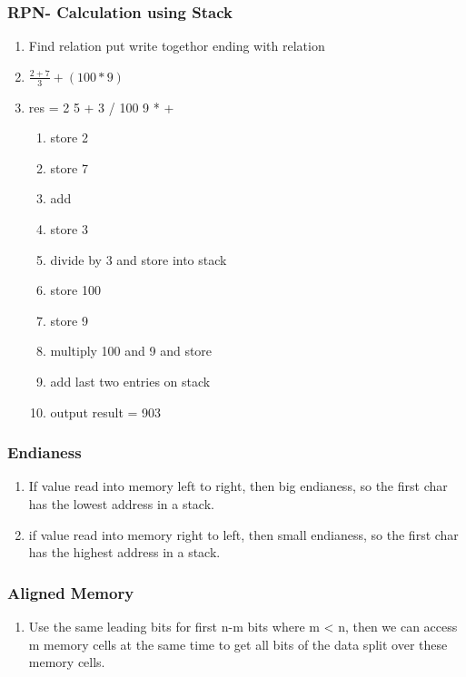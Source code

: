 \documentclass[11pt, a4paper]{article}
\begin{document}
\subsubsection{RPN- Calculation using Stack}
\begin{enumerate}
    \item Find relation put write togethor ending with relation
    \item $\frac{2+7}{3} + (100 * 9)$
    \item res = 2 5 + 3 / 100 9 * +
    \begin{enumerate}
        \item store 2
        \item store 7
        \item add
        \item store 3
        \item divide by 3 and store into stack
        \item store 100
        \item store 9
        \item multiply 100 and 9 and store
        \item add last two entries on stack
        \item output result = 903
    \end{enumerate}
\end{enumerate}

\subsubsection{Endianess}
\begin{enumerate}
    \item If value read into memory left to right, then big endianess, so the first char has the lowest address in a stack.
    \item if value read into memory right to left, then small endianess, so the first char has the highest address in  a stack.
\end{enumerate}

\subsubsection{Aligned Memory}
\begin{enumerate}
    \item Use the same leading bits for first n-m bits where m < n, then we can access m memory cells at the same time to get all bits of the data split over these memory cells.
\end{enumerate}
\end{document}
